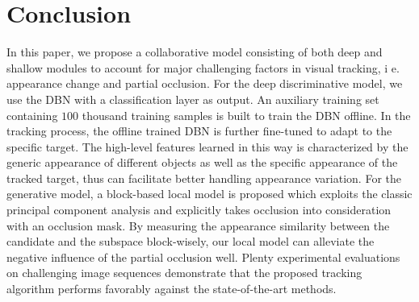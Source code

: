 \documentclass[preprint,12pt,review]{elsarticle}
\begin{document}
\section{Conclusion}
In this paper, we propose a collaborative model consisting of both deep and shallow modules to account for major challenging factors in visual tracking, i e. appearance change and partial occlusion.
For the deep discriminative model, we use the DBN with a classification layer as output.
An auxiliary training set containing $100$ thousand training samples is built to train the DBN offline.
In the tracking process, the offline trained DBN is further fine-tuned to adapt to the specific target.
The high-level features learned in this way is characterized by the generic appearance of different objects as well as the specific appearance of the tracked target, thus can facilitate better handling appearance variation.
For the generative model, a block-based local model is proposed which exploits the classic principal component analysis and explicitly takes occlusion into consideration with an occlusion mask.
By measuring the appearance similarity between the candidate and the subspace block-wisely, our local model can alleviate the negative influence of the partial occlusion well.
Plenty experimental evaluations on challenging image sequences demonstrate that the proposed tracking algorithm performs favorably against the state-of-the-art methods.


\end{document}
